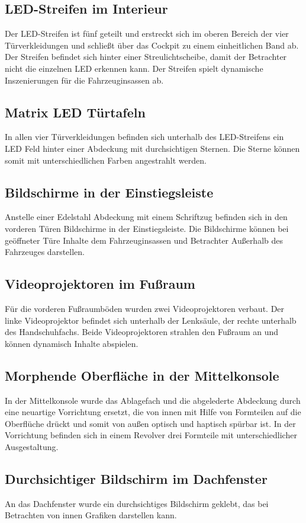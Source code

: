 \subsection{LED-Streifen im Interieur}
Der LED-Streifen ist fünf geteilt und erstreckt sich im oberen Bereich der vier Türverkleidungen und schließt über das Cockpit zu einem einheitlichen Band ab. Der Streifen befindet sich hinter einer Streulichtscheibe, damit der Betrachter nicht die einzelnen LED erkennen kann. 
Der Streifen spielt dynamische Inszenierungen für die Fahrzeuginsassen ab.
\subsection{Matrix LED Türtafeln}
In allen vier Türverkleidungen befinden sich unterhalb des LED-Streifens ein LED Feld hinter einer Abdeckung mit durchsichtigen Sternen. Die Sterne können somit mit unterschiedlichen Farben angestrahlt werden. 
\subsection{Bildschirme in der Einstiegsleiste}
Anstelle einer Edelstahl Abdeckung mit einem Schriftzug befinden sich in den vorderen Türen Bildschirme in der Einstiegsleiste. Die Bildschirme können bei geöffneter Türe Inhalte dem Fahrzeuginsassen und Betrachter Außerhalb des Fahrzeuges darstellen.
\subsection{Videoprojektoren im Fußraum}
Für die vorderen Fußraumböden wurden zwei Videoprojektoren verbaut. Der linke Videoprojektor befindet sich unterhalb der Lenksäule, der rechte unterhalb des Handschuhfachs. Beide Videoprojektoren strahlen den Fußraum an und können dynamisch Inhalte abspielen.
\subsection{Morphende Oberfläche in der Mittelkonsole}
In der Mittelkonsole wurde das Ablagefach und die abgelederte Abdeckung durch eine neuartige Vorrichtung ersetzt, die von innen mit Hilfe von Formteilen auf die Oberflüche drückt und somit von außen optisch und haptisch spürbar ist. In der Vorrichtung befinden sich in einem Revolver drei Formteile mit unterschiedlicher Ausgestaltung.
\subsection{Durchsichtiger Bildschirm im Dachfenster}
An das Dachfenster wurde ein durchsichtiges Bildschirm geklebt, das bei Betrachten von innen Grafiken darstellen kann.
